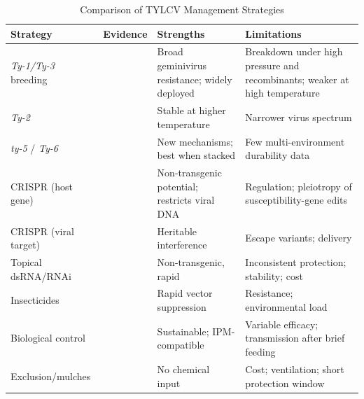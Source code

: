 \documentclass[journal]{IEEEtran}
\begin{document}
\begin{table}[!t]
\caption{Comparison of TYLCV Management Strategies}
\label{tab:comp}
\centering
\small
\begin{tabularx}{\textwidth}{@{}l l X X@{}}
\toprule
Strategy & Evidence & Strengths & Limitations \\
\midrule
\textit{Ty-1/Ty-3} breeding & \cite{elsappah2022,temp2021} & Broad geminivirus resistance; widely deployed & Breakdown under high pressure and recombinants; weaker at high temperature \\
\textit{Ty-2} & \cite{elsappah2022,temp2021} & Stable at higher temperature & Narrower virus spectrum \\
\textit{ty-5} / \textit{Ty-6} & \cite{pramanik2021,ty6_2024} & New mechanisms; best when stacked & Few multi-environment durability data \\
CRISPR (host gene) & \cite{pramanik2021} & Non-transgenic potential; restricts viral DNA & Regulation; pleiotropy of susceptibility-gene edits \\
CRISPR (viral target) & \cite{pramanik2021,tolcndv2025} & Heritable interference & Escape variants; delivery \\
Topical dsRNA/RNAi & \cite{tabein2022,dsrna2021} & Non-transgenic, rapid & Inconsistent protection; stability; cost \\
Insecticides & \cite{insects2024,florida2023} & Rapid vector suppression & Resistance; environmental load \\
Biological control & \cite{biocontrol2025} & Sustainable; IPM-compatible & Variable efficacy; transmission after brief feeding \\
Exclusion/mulches & \cite{circ2021} & No chemical input & Cost; ventilation; short protection window \\
\bottomrule
\end{tabularx}
\end{table}
\end{document}
